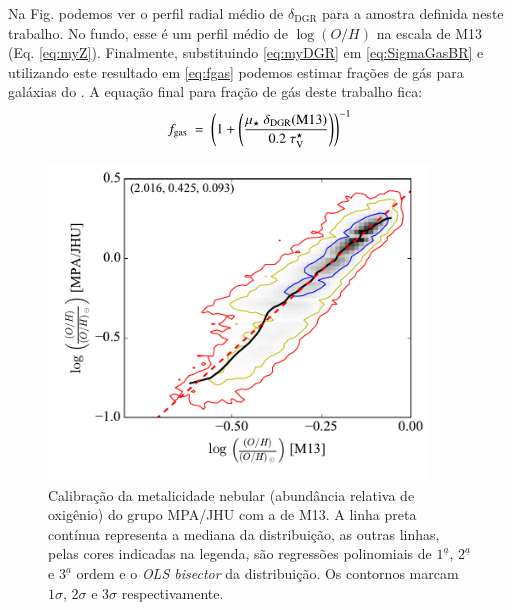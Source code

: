 Na Fig. \label{fig:DGR_R} podemos ver o perfil radial médio de $\delta_{\mathrm{DGR}}$ para a
amostra definida neste trabalho. No fundo, esse é um perfil médio de $\log (O/H)$ na escala de M13
(Eq. \ref{eq:myZ}). Finalmente, substituindo \eqref{eq:myDGR} em \eqref{eq:SigmaGasBR} e utilizando
este resultado em \eqref{eq:fgas} podemos estimar frações de gás para galáxias do \CAL. A equação
final para fração de gás deste trabalho fica:
\begin{equation}
	f_{\mathrm{gas}}\ =\ \left(1 + \left(\frac{\mu_\star\ \delta_{\mathrm{DGR}}(\mathrm{M13})}{0.2\ 
\tauVS}\right)\right)^{-1}
	\label{eq:fgasthiswork}
\end{equation}

\begin{figure}
	\centering
	\includegraphics[width=0.9\textwidth]{figuras/logOH_ZnebMPA.pdf}
	\caption[Calibração das metalicidades.]
	{Calibração da metalicidade nebular (abundância relativa de oxigênio) do grupo MPA/JHU com a de
M13. A linha preta contínua representa a mediana da distribuição, as outras linhas, pelas cores
indicadas na legenda, são regressões polinomiais de $1^\underline{a}$, $2^\underline{a}$ e
$3^\underline{a}$ ordem e o {\em OLS bisector} da distribuição. Os contornos marcam $1\sigma$,
$2\sigma$ e $3\sigma$ respectivamente.}
	\label{fig:calibZ}
\end{figure}

